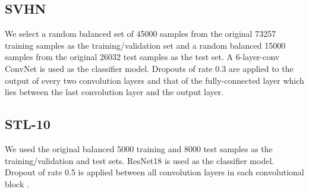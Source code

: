 \documentclass[runningheads, envcountsame, a4paper]{llncs}
\begin{document}
\subsection{SVHN \cite{Netzer11} }
We select a random balanced set of 45000 samples from the original 73257 training samples as the training/validation set and a random balanced 15000 samples from the original 26032 test samples as the test set. A 6-layer-conv ConvNet is used as the classifier model. Dropouts of rate 0.3 are applied to the output of every two convolution layers and that of the fully-connected layer which lies between the last convolution layer and the output layer. 

\subsection{STL-10 \cite{Coates11} }
We used the original balanced 5000 training and 8000 test samples as the training/validation and test sets. ResNet18 \cite{He16} is used as the classifier model. Dropout of rate 0.5 is applied between all convolution layers in each convolutional block \cite{Zagoruyko16}. 




\end{document}
